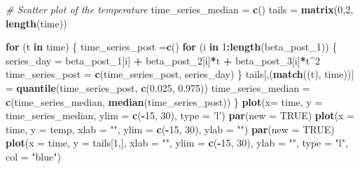 \documentclass[]{article}
\newenvironment{Shaded}{\begin{snugshade}}{\end{snugshade}}
\newcommand{\CommentTok}[1]{\textcolor[rgb]{0.56,0.35,0.01}{\textit{#1}}}
\newcommand{\ControlFlowTok}[1]{\textcolor[rgb]{0.13,0.29,0.53}{\textbf{#1}}}
\newcommand{\DataTypeTok}[1]{\textcolor[rgb]{0.13,0.29,0.53}{#1}}
\newcommand{\DecValTok}[1]{\textcolor[rgb]{0.00,0.00,0.81}{#1}}
\newcommand{\FloatTok}[1]{\textcolor[rgb]{0.00,0.00,0.81}{#1}}
\newcommand{\KeywordTok}[1]{\textcolor[rgb]{0.13,0.29,0.53}{\textbf{#1}}}
\newcommand{\NormalTok}[1]{#1}
\newcommand{\OperatorTok}[1]{\textcolor[rgb]{0.81,0.36,0.00}{\textbf{#1}}}
\newcommand{\OtherTok}[1]{\textcolor[rgb]{0.56,0.35,0.01}{#1}}
\newcommand{\StringTok}[1]{\textcolor[rgb]{0.31,0.60,0.02}{#1}}
\begin{document}
\begin{Shaded}
\begin{Highlighting}[]
\CommentTok{# Scatter plot of the temperature}
\NormalTok{time_series_median =}\StringTok{ }\KeywordTok{c}\NormalTok{()}
\NormalTok{tails =}\StringTok{ }\KeywordTok{matrix}\NormalTok{(}\DecValTok{0}\NormalTok{,}\DecValTok{2}\NormalTok{, }\KeywordTok{length}\NormalTok{(time))}

\ControlFlowTok{for}\NormalTok{ (t }\ControlFlowTok{in}\NormalTok{ time) \{}
\NormalTok{  time_series_post =}\KeywordTok{c}\NormalTok{()}
  \ControlFlowTok{for}\NormalTok{ (i }\ControlFlowTok{in} \DecValTok{1}\OperatorTok{:}\KeywordTok{length}\NormalTok{(beta_post_}\DecValTok{1}\NormalTok{)) \{}
\NormalTok{    series_day =}\StringTok{ }\NormalTok{beta_post_}\DecValTok{1}\NormalTok{[i] }\OperatorTok{+}\StringTok{ }\NormalTok{beta_post_}\DecValTok{2}\NormalTok{[i]}\OperatorTok{*}\NormalTok{t }\OperatorTok{+}\StringTok{ }\NormalTok{beta_post_}\DecValTok{3}\NormalTok{[i]}\OperatorTok{*}\NormalTok{t}\OperatorTok{^}\DecValTok{2}
\NormalTok{    time_series_post =}\StringTok{ }\KeywordTok{c}\NormalTok{(time_series_post, series_day)}
\NormalTok{  \}}
\NormalTok{  tails[,(}\KeywordTok{match}\NormalTok{((t), time))] =}\StringTok{ }\KeywordTok{quantile}\NormalTok{(time_series_post, }\KeywordTok{c}\NormalTok{(}\FloatTok{0.025}\NormalTok{, }\FloatTok{0.975}\NormalTok{))}
\NormalTok{  time_series_median =}\StringTok{ }\KeywordTok{c}\NormalTok{(time_series_median, }\KeywordTok{median}\NormalTok{(time_series_post))}
\NormalTok{\}}
\KeywordTok{plot}\NormalTok{(}\DataTypeTok{x=}\NormalTok{ time, }\DataTypeTok{y =}\NormalTok{ time_series_median, }\DataTypeTok{ylim =} \KeywordTok{c}\NormalTok{(}\OperatorTok{-}\DecValTok{15}\NormalTok{, }\DecValTok{30}\NormalTok{), }\DataTypeTok{type =} \StringTok{'l'}\NormalTok{)}
\KeywordTok{par}\NormalTok{(}\DataTypeTok{new =} \OtherTok{TRUE}\NormalTok{)}
\KeywordTok{plot}\NormalTok{(}\DataTypeTok{x =}\NormalTok{ time, }\DataTypeTok{y =}\NormalTok{ temp, }\DataTypeTok{xlab =} \StringTok{""}\NormalTok{, }\DataTypeTok{ylim =} \KeywordTok{c}\NormalTok{(}\OperatorTok{-}\DecValTok{15}\NormalTok{, }\DecValTok{30}\NormalTok{), }\DataTypeTok{ylab =} \StringTok{""}\NormalTok{)}
\KeywordTok{par}\NormalTok{(}\DataTypeTok{new =} \OtherTok{TRUE}\NormalTok{)}
\KeywordTok{plot}\NormalTok{(}\DataTypeTok{x =}\NormalTok{ time, }\DataTypeTok{y =}\NormalTok{ tails[}\DecValTok{1}\NormalTok{,], }\DataTypeTok{xlab =} \StringTok{""}\NormalTok{, }\DataTypeTok{ylim =} \KeywordTok{c}\NormalTok{(}\OperatorTok{-}\DecValTok{15}\NormalTok{, }\DecValTok{30}\NormalTok{), }\DataTypeTok{ylab =} \StringTok{""}\NormalTok{, }\DataTypeTok{type =} \StringTok{"l"}\NormalTok{, }\DataTypeTok{col =} \StringTok{"blue"}\NormalTok{)}

\end{Highlighting}
\end{Shaded}
\end{document}
